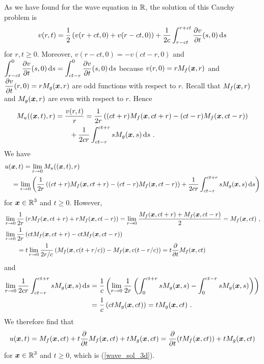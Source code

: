 \begin{rmk}
As we have found for the wave equation in $\RR$, the solution of this
Cauchy problem is
\[
v(r,t) = \frac{1}{2}\left(v(r+ct,0)+v(r-ct,0)\right)
+\frac{1}{2c} \int_{r-ct}^{r+ct} \pdydx{v}{t}(s,0)\dx{s}
\]
for $r,t \geq 0$.  Moreover, $v(r-ct,0) = -v(ct-r,0)$
and $\DS \int_{r-ct}^0 \pdydx{v}{t}(s,0)\dx{s} =
\int_{ct-r}^{0} \pdydx{v}{t}(s,0)\dx{s}$ because
$v(r,0) = rM_f(\VEC{x},r)$ and
$\DS \pdydx{v}{t}(r,0) = rM_g(\VEC{x},r)$ are odd functions
with respect to $r$.  Recall that $M_f(\VEC{x},r)$ and $M_g(\VEC{x},r)$
are even with respect to $r$.  Hence
\begin{align*}
M_u((\VEC{x},t),r) &= \frac{v(r,t)}{r}
 = \frac{1}{2r}\left( (ct+r)M_f(\VEC{x},ct+r)
- (ct-r)M_f(\VEC{x},ct-r) \right) \\
&\qquad + \frac{1}{2cr} \int_{ct-r}^{ct+r} s M_g(\VEC{x},s) \dx{s} \ .
\end{align*}
We have
\begin{align*}
&u(\VEC{x},t) = \lim_{r\rightarrow 0} M_u((\VEC{x},t),r) \\
&\quad = \lim_{r\rightarrow 0} \left( \frac{1}{2r}\left( (ct+r)M_f(\VEC{x},ct+r)
- (ct-r)M_f(\VEC{x},ct-r) \right) + \frac{1}{2cr}
\int_{ct-r}^{ct+r} s M_g(\VEC{x},s) \dx{s}\right)
\end{align*}
for $\DS \VEC{x} \in \RR^3$ and $t\geq 0$.   However,
\begin{align*}
&\lim_{r\rightarrow 0} \frac{1}{2r}\left( r M_f(\VEC{x},ct+r)
+rM_f(\VEC{x},ct-r) \right)
= \lim_{r\rightarrow 0} \frac{M_f(\VEC{x},ct+r)
+M_f(\VEC{x},ct-r)}{2} = M_f(\VEC{x},ct) \ , \\
&\lim_{r\rightarrow 0} \frac{1}{2r}\left( ct M_f(\VEC{x},ct+r)
- ct M_f(\VEC{x},ct-r)\right) \\
&\qquad = t \lim_{r\rightarrow 0} \frac{1}{2r/c}\left( M_f(\VEC{x},c(t+r/c))
- M_f(\VEC{x},c(t-r/c)\right) =  t \pdfdx{ M_f(\VEC{x},ct) }{t}
\end{align*}
and
\begin{align*}
\lim_{r\rightarrow 0} \frac{1}{2cr} \int_{ct-r}^{ct+r} s M_g(\VEC{x},s)
\dx{s}
&= \frac{1}{c} \left(
\lim_{r\rightarrow 0} \frac{1}{2r} \left( \int_0^{ct+r} s M_g(\VEC{x},s)
- \int_0^{ct-r} s M_g(\VEC{x},s)\right) \right) \\
&= \frac{1}{c} \left( ct  M_g(\VEC{x},ct) \right)
= t  M_g(\VEC{x},ct) \ .
\end{align*}
We therefore find that
\[
u(\VEC{x},t) = M_f(\VEC{x},ct) + t \pdfdx{ M_f(\VEC{x},ct) }{t} +
tM_g(\VEC{x},ct)
= \pdfdx{ \left(t M_f(\VEC{x},ct)\right) }{t} + tM_g(\VEC{x},ct)
\]
for $\DS \VEC{x}\in \RR^3$ and $t \geq 0$, which is
(\ref{wave_sol_3d}).
\end{rmk}

